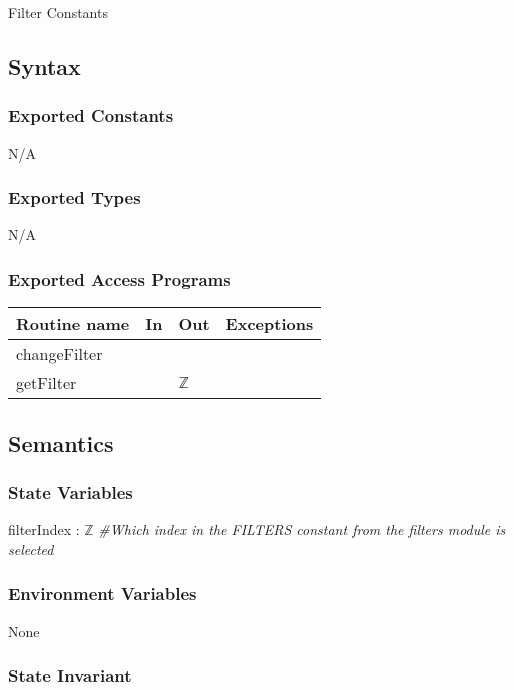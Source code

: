 \documentclass[12pt, titlepage]{article}
\begin{document}
Filter Constants

\subsection* {Syntax}

\subsubsection* {Exported Constants}

N/A


\subsubsection* {Exported Types}

N/A

\subsubsection* {Exported Access Programs}

\begin{tabular}{| l | l | l | l |}
\hline
\textbf{Routine name} & \textbf{In} & \textbf{Out} & \textbf{Exceptions}\\
\hline
changeFilter &  &  & \\
\hline
getFilter &  & $\mathbb{Z}$ & \\
\hline
\end{tabular}

\subsection* {Semantics}

\subsubsection* {State Variables}

filterIndex : $\mathbb{Z}$ \textit{\#Which index in the FILTERS constant from the filters module is selected}

\subsubsection* {Environment Variables}

None

\subsubsection* {State Invariant}
\end{document}
